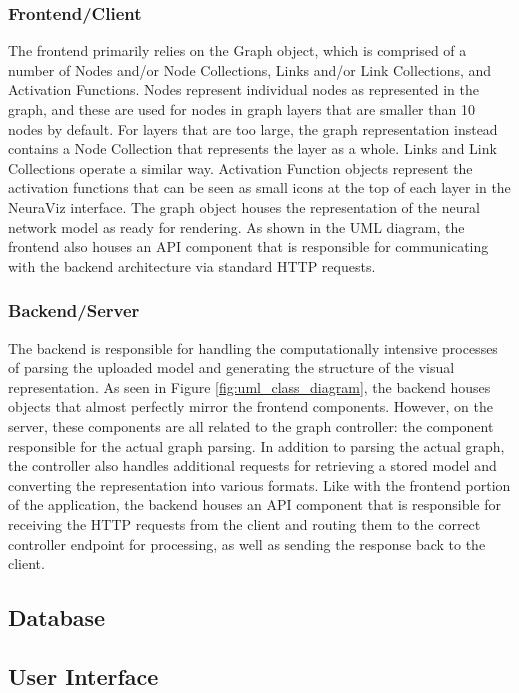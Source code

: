 \subsubsection{Frontend/Client}
The frontend primarily relies on the Graph object, which is comprised of a number of Nodes and/or Node Collections, Links and/or Link Collections, and Activation Functions. Nodes represent individual nodes as represented in the graph, and these are used for nodes in graph layers that are smaller than 10 nodes by default. For layers that are too large, the graph representation instead contains a Node Collection that represents the layer as a whole. Links and Link Collections operate a similar way. Activation Function objects represent the activation functions that can be seen as small icons at the top of each layer in the NeuraViz interface. The graph object houses the representation of the neural network model as ready for rendering. As shown in the UML diagram, the frontend also houses an API component that is responsible for communicating with the backend architecture via standard HTTP requests.

\subsubsection{Backend/Server}
The backend is responsible for handling the computationally intensive processes of parsing the uploaded model and generating the structure of the visual representation. As seen in Figure \ref{fig:uml_class_diagram}, the backend houses objects that almost perfectly mirror the frontend components. However, on the server, these components are all related to the graph controller: the component responsible for the actual graph parsing. In addition to parsing the actual graph, the controller also handles additional requests for retrieving a stored model and converting the representation into various formats. Like with the frontend portion of the application, the backend houses an API component that is responsible for receiving the HTTP requests from the client and routing them to the correct controller endpoint for processing, as well as sending the response back to the client.

\subsection{Database}

\subsection{User Interface}
